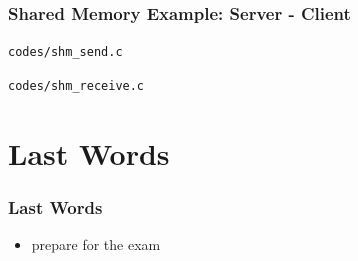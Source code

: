 \documentclass[newPxFont,sthlmFooter,nooffset]{beamer}
\begin{document}
\begin{frame}[t]
  \frametitle{Shared Memory Example: Server - Client}
\texttt{codes/shm\_send.c}
 

\newpage
\texttt{codes/shm\_receive.c}
  
\end{frame}




\section{Last Words}

\begin{frame}[t]
  \frametitle{Last Words}

\begin{itemize}
\item prepare for the exam
\end{itemize}
\end{frame}
\end{document}

